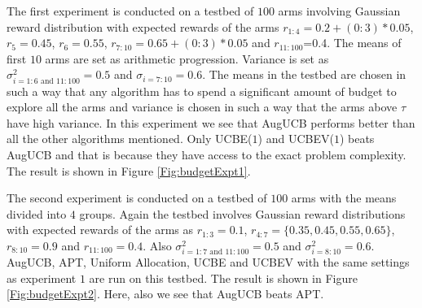 	The first experiment is conducted on a testbed of $100$ arms involving Gaussian reward distribution with expected rewards of the arms $r_{1:4}=0.2+(0:3)*0.05$, $r_{5}=0.45$, $r_{6}=0.55$, $r_{7:10}=0.65+(0:3)*0.05$ and $r_{11:100}$=0.4. The means of first $10$ arms are set as arithmetic progression. Variance is set as $\sigma_{i=1:6 \text{ and } 11:100}^{2}=0.5$ and $\sigma_{i=7:10}=0.6$. The means in the testbed are chosen in such a way that any algorithm has to spend a significant amount of budget to explore all the arms and variance is chosen in such a way that the arms above $\tau$ have high variance. In this experiment we see that AugUCB performs better than all the other algorithms mentioned. Only UCBE($1$) and UCBEV($1$) beats AugUCB and that is because they have access to the exact problem complexity. The result is shown in Figure \ref{Fig:budgetExpt1}.
	
	The second experiment is conducted on a testbed of $100$ arms with the means divided into $4$ groups. Again the testbed involves Gaussian reward distributions with expected rewards of the arms as $r_{1:3}=0.1$, $r_{4:7}=\lbrace 0.35,0.45,0.55,0.65\rbrace$, $r_{8:10}=0.9$ and  $r_{11:100}=0.4$. Also $\sigma_{i=1:7 \text{ and } 11:100}^{2}=0.5$ and $\sigma^{2}_{i=8:10}=0.6$. AugUCB, APT, Uniform Allocation, UCBE and UCBEV with the same settings as experiment $1$ are run on this testbed. The result is shown in Figure \ref{Fig:budgetExpt2}. Here, also we see that AugUCB beats APT.  
	

